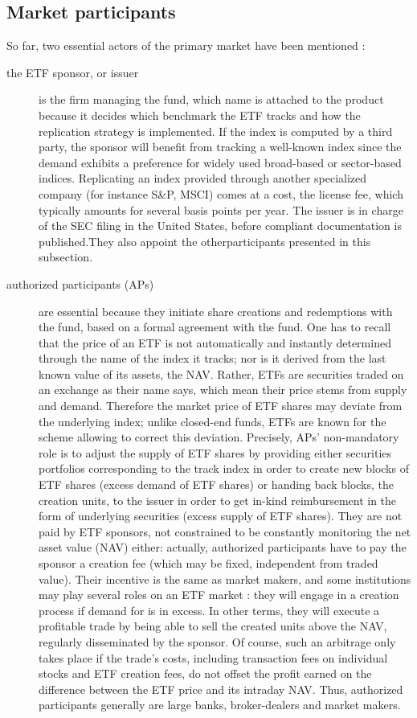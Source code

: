\subsection{Market participants}
So far, two essential actors of the primary market have been mentioned :
\begin{description}
\item[the ETF sponsor, or issuer] is the firm managing the fund, which name is attached to the product because it decides which benchmark the ETF tracks and how the replication strategy is implemented. If the index is computed by a third party, the sponsor will benefit from tracking a well-known index since the demand exhibits a preference for widely used broad-based or sector-based indices. Replicating an index provided through another specialized company (for instance S\&P, MSCI) comes at a cost, the license fee, which typically amounts for several basis points per year. The issuer is in charge of the SEC filing in the United States, before compliant documentation is published.They also appoint the otherparticipants presented in this subsection.
\item[authorized participants (APs)] are essential because they initiate share creations and redemptions with the fund, based on a formal agreement with the fund. One has to recall that the price of an ETF is not automatically and instantly determined through the name of the index it tracks; nor is it derived from the last known value of its assets, the NAV. Rather, ETFs are securities traded on an exchange as their name says, which mean their price stems from supply and demand. Therefore the market price of ETF shares may deviate from the underlying index; unlike closed-end funds, ETFs are known for the scheme allowing to correct this deviation. Precisely, APs' non-mandatory role is to adjust the supply of ETF shares by providing either securities portfolios corresponding to the track index in order to create new blocks of ETF shares (excess demand of ETF shares) or handing back blocks, the creation units, to the issuer in order to get in-kind reimbursement in the form of underlying securities (excess supply of ETF shares). They are not paid by ETF sponsors, not constrained to be constantly monitoring the net asset value (NAV) either: actually, authorized participants have to pay the sponsor a creation fee (which may be fixed, independent from traded value). Their incentive is the same as market makers, and some institutions may play several roles on an ETF market : they will engage in a creation process if demand for is in excess. In other terms, they will execute a profitable trade by being able to sell the created units above the NAV, regularly disseminated by the sponsor. Of course, such an arbitrage only takes place if the trade's costs, including transaction fees on individual stocks and ETF creation fees, do not offset the profit earned on the difference between the ETF price and its intraday NAV. Thus, authorized participants generally are large banks, broker-dealers and market makers.
\end{description}

